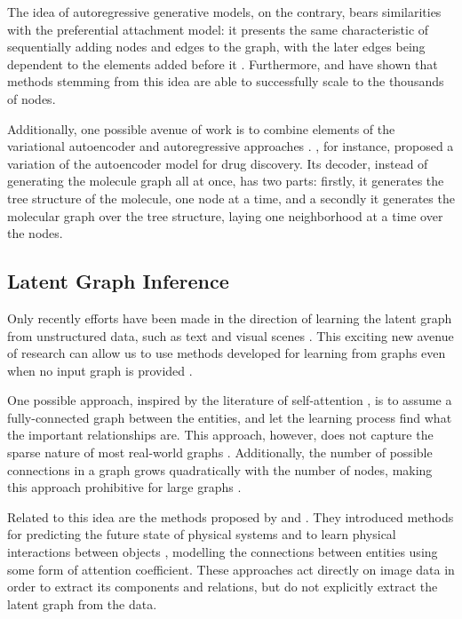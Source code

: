 \documentclass[12pt,a4paper]{article}
\begin{document}
	The idea of autoregressive generative models, on the contrary, bears similarities with the preferential attachment model: it presents the same characteristic of sequentially adding nodes and edges to the graph, with the later edges being dependent to the elements added before it \citep{Li2018, You2018, Liao2019}. Furthermore, \textcite{You2018} and \textcite{Liao2019} have shown that methods stemming from this idea are able to successfully scale to the thousands of nodes.

	Additionally, one possible avenue of work is to combine elements of the variational autoencoder and autoregressive approaches \citep{Hamilton2020}. \textcite{Jin2018}, for instance, proposed a variation of the autoencoder model for drug discovery. Its decoder, instead of generating the molecule graph all at once, has two parts: firstly, it generates the tree structure of the molecule, one node at a time, and a secondly it generates the molecular graph over the tree structure, laying one neighborhood at a time over the nodes.

	\subsection{Latent Graph Inference}
	\label{sec:latent_graph_inference}

	Only recently efforts have been made in the direction of learning the latent graph from unstructured data, such as text and visual scenes \citep{Vaswani2017, Wang2018, Watters2017, VanSteenkiste2018, KipfNRI2018}. This exciting new avenue of research can allow us to use methods developed for learning from graphs even when no input graph is provided \citep{Hamilton2020}.

	One possible approach, inspired by the literature of self-attention \citep{Vaswani2017}, is to assume a fully-connected graph between the entities, and let the learning process find what the important relationships are. This approach, however, does not capture the sparse nature of most real-world graphs \citep{Newman2019}. Additionally, the number of possible connections in a graph grows quadratically with the number of nodes, making this approach prohibitive for large graphs \citep{Battaglia2018}.

	Related to this idea are the methods proposed by \textcite{Watters2017} and \textcite{VanSteenkiste2018}. They introduced methods for predicting the future state of physical systems \citep{Watters2017} and to learn physical interactions between objects \citep{VanSteenkiste2018}, modelling the connections between entities using some form of attention coefficient. These approaches act directly on image data in order to extract its components and relations, but do not explicitly extract the latent graph from the data.
\end{document}
